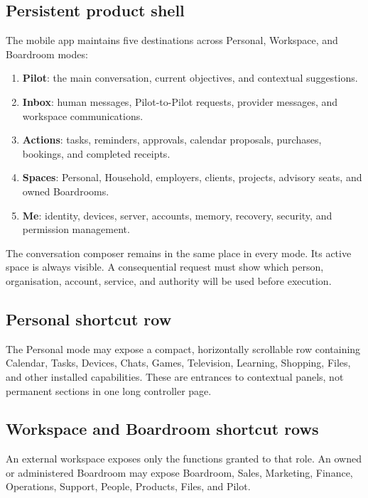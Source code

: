 \documentclass[11pt,a4paper]{article}
\newcommand{\term}[1]{\textbf{#1}}
\begin{document}
\subsection{Persistent product shell}

The mobile app maintains five destinations across Personal, Workspace, and
Boardroom modes:

\begin{enumerate}[leftmargin=*]
  \item \term{Pilot}: the main conversation, current objectives, and contextual suggestions.
  \item \term{Inbox}: human messages, Pilot-to-Pilot requests, provider messages, and workspace communications.
  \item \term{Actions}: tasks, reminders, approvals, calendar proposals, purchases, bookings, and completed receipts.
  \item \term{Spaces}: Personal, Household, employers, clients, projects, advisory seats, and owned Boardrooms.
  \item \term{Me}: identity, devices, server, accounts, memory, recovery, security, and permission management.
\end{enumerate}

The conversation composer remains in the same place in every mode.  Its active
space is always visible.  A consequential request must show which person,
organisation, account, service, and authority will be used before execution.

\subsection{Personal shortcut row}

The Personal mode may expose a compact, horizontally scrollable row containing
Calendar, Tasks, Devices, Chats, Games, Television, Learning, Shopping, Files,
and other installed capabilities.  These are entrances to contextual panels,
not permanent sections in one long controller page.

\subsection{Workspace and Boardroom shortcut rows}

An external workspace exposes only the functions granted to that role.  An
owned or administered Boardroom may expose Boardroom, Sales, Marketing,
Finance, Operations, Support, People, Products, Files, and Pilot.
\end{document}
